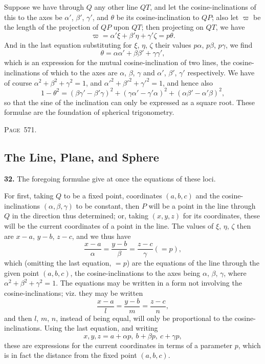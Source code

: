 \documentclass[11pt,a4paper]{book}
\begin{document}
Suppose we have through $Q$ any other line $QT$, and let the cosine-inclinations of this to the axes be $\alpha'$, $\beta'$, $\gamma'$, and $\theta$ be its cosine-inclination to $QP$; also let $\varpi$ be the length of the projection of $QP$ upon $QT$; then projecting on $QT$, we have
\[
\varpi = \alpha'\xi + \beta'\eta + \gamma'\zeta = p\theta.
\]
And in the last equation substituting for $\xi$, $\eta$, $\zeta$ their values $p\alpha$, $p\beta$, $p\gamma$, we find
\[
\theta = \alpha\alpha' + \beta\beta' + \gamma\gamma',
\]
which is an expression for the mutual cosine-inclination of two lines, the cosine-inclinations of which to the axes are $\alpha$, $\beta$, $\gamma$ and $\alpha'$, $\beta'$, $\gamma'$ respectively. We have of course $\alpha^2+\beta^2+\gamma^2=1$, and $\alpha'^2+\beta'^2+\gamma'^2=1$, and hence also
\[
1-\theta^2 = (\beta\gamma'-\beta'\gamma)^2 + (\gamma\alpha'-\gamma'\alpha)^2 + (\alpha\beta'-\alpha'\beta)^2,
\]
so that the sine of the inclination can only be expressed as a square root. These formulae are the foundation of spherical trigonometry.

\newpage
\noindent\textsc{Page~571.} \subsection*{The Line, Plane, and Sphere}

\textbf{32.} The foregoing formulae give at once the equations of these loci.

For first, taking $Q$ to be a fixed point, coordinates $(a,b,c)$ and the cosine-inclinations $(\alpha,\beta,\gamma)$ to be constant, then $P$ will be a point in the line through $Q$ in the direction thus determined; or, taking $(x,y,z)$ for its coordinates, these will be the current coordinates of a point in the line. The values of $\xi$, $\eta$, $\zeta$ then are $x-a$, $y-b$, $z-c$, and we thus have
\[
\frac{x-a}{\alpha} = \frac{y-b}{\beta} = \frac{z-c}{\gamma} (= p),
\]
which (omitting the last equation, $=p$) are the equations of the line through the given point $(a,b,c)$, the cosine-inclinations to the axes being $\alpha$, $\beta$, $\gamma$, where $\alpha^2+\beta^2+\gamma^2=1$. The equations may be written in a form not involving the cosine-inclinations; viz. they may be written
\[
\frac{x-a}{l} = \frac{y-b}{m} = \frac{z-c}{n},
\]
and then $l$, $m$, $n$, instead of being equal, will only be proportional to the cosine-inclinations. Using the last equation, and writing
\[
x, y, z = a+\alpha p,\ b+\beta p,\ c+\gamma p,
\]
these are expressions for the current coordinates in terms of a parameter $p$, which is in fact the distance from the fixed point $(a,b,c)$.
\end{document}
